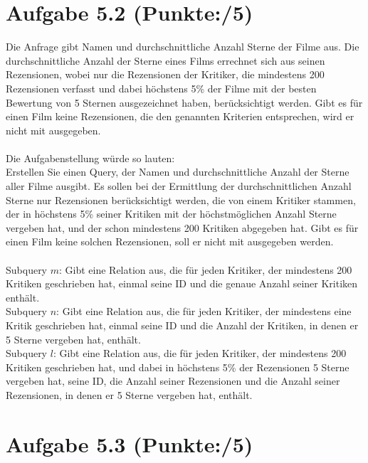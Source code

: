 \documentclass[11pt, a4paper]{article}
\newcommand{\blattnummer}{5}
\newcommand{\pp}{5}
\newcommand{\ppp}{5}
\newcommand{\aufgabe}[2] {\section*{Aufgabe \blattnummer.#1 (Punkte:\qquad/#2)}}
\begin{document}
\aufgabe{2}{\pp}
\begin{adjustwidth}{20pt}{20pt}
Die Anfrage gibt Namen und durchschnittliche Anzahl Sterne der Filme aus. Die durchschnittliche Anzahl der Sterne eines Films errechnet sich aus seinen Rezensionen, wobei nur die Rezensionen der Kritiker, die mindestens 200 Rezensionen verfasst und dabei höchstens 5\% der Filme mit der besten Bewertung von 5 Sternen ausgezeichnet haben, berücksichtigt werden. Gibt es für einen Film keine Rezensionen, die den genannten Kriterien entsprechen, wird er nicht mit ausgegeben.\\ \ \\
Die Aufgabenstellung würde so lauten:\\
\glqq Erstellen Sie einen Query, der Namen und durchschnittliche Anzahl der Sterne aller Filme ausgibt. Es sollen bei der Ermittlung der durchschnittlichen Anzahl Sterne nur Rezensionen berücksichtigt werden, die von einem Kritiker stammen, der in höchstens 5\% seiner Kritiken mit der höchstmöglichen Anzahl Sterne vergeben hat, und der schon mindestens 200 Kritiken abgegeben hat. Gibt es für einen Film keine solchen Rezensionen, soll er nicht mit ausgegeben werden.\grqq\\ \ \\
Subquery $m$: Gibt eine Relation aus, die für jeden Kritiker, der mindestens 200 Kritiken geschrieben hat, einmal seine ID und die genaue Anzahl seiner Kritiken enthält.\\
Subquery $n$: Gibt eine Relation aus, die für jeden Kritiker, der mindestens eine Kritik geschrieben hat, einmal seine ID und die Anzahl der Kritiken, in denen er 5 Sterne vergeben hat, enthält.\\
Subquery $l$: Gibt eine Relation aus, die für jeden Kritiker, der mindestens 200 Kritiken geschrieben hat, und dabei in höchstens 5\% der Rezensionen 5 Sterne vergeben hat, seine ID, die Anzahl seiner Rezensionen und die Anzahl seiner Rezensionen, in denen er 5 Sterne vergeben hat, enthält.
\end{adjustwidth}



\aufgabe{3}{\ppp}
\begin{adjustwidth}{20pt}{20pt}


\end{adjustwidth}


\end{document}
